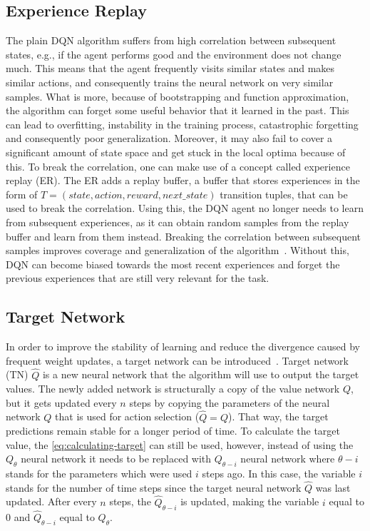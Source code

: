 \documentclass{article}
\begin{document}
\subsection{Experience Replay}
\label{subsec:experience-replay}
The plain DQN algorithm suffers from high correlation between subsequent states, e.g., if the agent performs good and the environment does not change much.
This means that the agent frequently visits similar states and makes similar actions,
and consequently trains the neural network on very similar samples.
What is more, because of bootstrapping and function approximation, the algorithm can forget some useful behavior that it learned in the past.
This can lead to overfitting, instability in the training process, catastrophic forgetting and consequently poor generalization.
Moreover, it may also fail to cover a significant amount of state space and get stuck
in the local optima because of this.
To break the correlation, one can make use of a concept called experience replay (ER).
The ER adds a replay buffer, a buffer that stores experiences in the form of $T=(state, action, reward, next\_state)$ transition tuples, that can be used to break the correlation.
Using this, the DQN agent no longer needs to learn from subsequent experiences, as it can obtain random samples
from the replay buffer and learn from them instead.
Breaking the correlation between subsequent samples improves coverage and generalization of the algorithm~\cite{DBLP:books/sp/Plaat22}.
Without this, DQN can become biased towards the most recent experiences and forget the previous experiences
that are still very relevant for the task.

\subsection{Target Network}
\label{subsec:target-network}
In order to improve the stability of learning and reduce the divergence caused by frequent weight updates,
a target network can be introduced~\cite{DBLP:books/sp/Plaat22}.
Target network (TN) $\hat Q$ is a new neural network that the algorithm will use to output the target values.
The newly added network is structurally a copy of the value network $Q$, but it gets updated every $n$ steps
by copying the parameters of the neural network $Q$ that is used for action selection ($\hat Q = Q$).
That way, the target predictions remain stable for a longer period of time.
To calculate the target value, the \autoref{eq:calculating-target} can still be used, however, instead of using the $Q_\theta$
neural network it needs to be replaced with $Q_{\theta - i}$ neural network where $\theta - i$ stands for the parameters
which were used $i$ steps ago.
In this case, the variable $i$ stands for the number of time steps since the target neural network $\hat Q$ was last updated.
After every $n$ steps, the $\hat Q_{\theta - i}$ is updated, making the variable $i$ equal to 0 and $\hat Q_{\theta - i}$
equal to $Q_\theta$.
\end{document}
